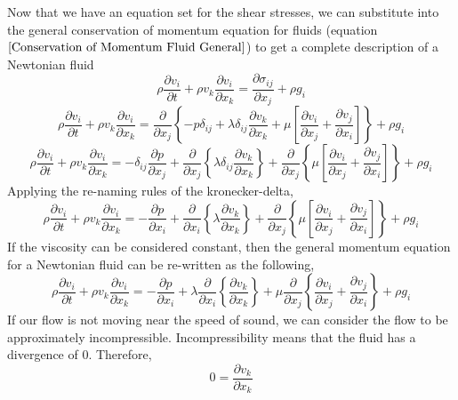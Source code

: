 
Now that we have an equation set for the shear stresses, we can substitute into the general conservation of momentum equation for fluids (equation $\ref{Conservation of Momentum Fluid General}$) to get a complete description of a Newtonian fluid
$$\rho\frac{\partial v_{i}}{\partial t} + \rho v_{k}\frac{\partial v_{i}}{\partial x_{k}} = \frac{\partial \sigma_{ij}}{\partial x_{j}}  +  \rho g_{i}$$ 
$$\rho\frac{\partial v_{i}}{\partial t} + \rho v_{k}\frac{\partial v_{i}}{\partial x_{k}} = \frac{\partial}{\partial x_{j}}\left\{-p\delta_{ij} + \lambda \delta_{ij}\frac{\partial v_{k}}{\partial x_{k}} + \mu\left[\frac{\partial v_{i}}{\partial x_{j}} + \frac{\partial v_{j}}{\partial x_{i}}\right]\right\}  +  \rho g_{i}$$ 
$$\rho\frac{\partial v_{i}}{\partial t} + \rho v_{k}\frac{\partial v_{i}}{\partial x_{k}} = -\delta_{ij}\frac{\partial p}{\partial x_{j}} + \frac{\partial}{\partial x_{j}}\left\{\lambda \delta_{ij}\frac{\partial v_{k}}{\partial x_{k}}\right\} + \frac{\partial}{\partial x_{j}}\left\{\mu\left[\frac{\partial v_{i}}{\partial x_{j}} + \frac{\partial v_{j}}{\partial x_{i}}\right]\right\}  +  \rho g_{i}$$ 
Applying the re-naming rules of the kronecker-delta,
\begin{equation}
\rho\frac{\partial v_{i}}{\partial t} + \rho v_{k}\frac{\partial v_{i}}{\partial x_{k}} = -\frac{\partial p}{\partial x_{i}} + \frac{\partial}{\partial x_{i}}\left\{\lambda\frac{\partial v_{k}}{\partial x_{k}}\right\} + \frac{\partial}{\partial x_{j}}\left\{\mu\left[\frac{\partial v_{i}}{\partial x_{j}} + \frac{\partial v_{j}}{\partial x_{i}}\right]\right\}  +  \rho g_{i} 
\label{Navier-Stokes Momentum Equation General}
\end{equation} 
If the viscosity can be considered constant, then the general momentum equation for a Newtonian fluid can be re-written as the following,
\begin{equation}
\rho\frac{\partial v_{i}}{\partial t} + \rho v_{k}\frac{\partial v_{i}}{\partial x_{k}} = -\frac{\partial p}{\partial x_{i}} + \lambda\frac{\partial}{\partial x_{i}}\left\{\frac{\partial v_{k}}{\partial x_{k}}\right\} + \mu\frac{\partial}{\partial x_{j}}\left\{ \frac{\partial v_{i}}{\partial x_{j}} + \frac{\partial v_{j}}{\partial x_{i}} \right\}  +  \rho g_{i}
\label{Navier-Stokes Momentum Constant Viscosity}
\end{equation} 
If our flow is not moving near the speed of sound, we can consider the flow to be approximately incompressible.
Incompressibility means that the fluid has a divergence of $0$. Therefore,
$$0 = \frac{\partial v_{k}}{\partial x_{k}}$$
